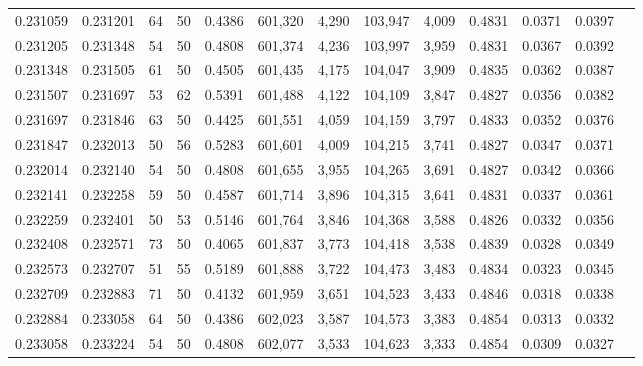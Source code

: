\begin{tabular}{rrrrrrrrrrrrr}
0.231059 & 0.231201 &    64 &  50 &                                     0.4386 & 601,320 &   4,290 & 103,947 &   4,009 & 0.4831 & 0.0371 & 0.0397 \\
0.231205 & 0.231348 &    54 &  50 &                                     0.4808 & 601,374 &   4,236 & 103,997 &   3,959 & 0.4831 & 0.0367 & 0.0392 \\
0.231348 & 0.231505 &    61 &  50 &                                     0.4505 & 601,435 &   4,175 & 104,047 &   3,909 & 0.4835 & 0.0362 & 0.0387 \\
0.231507 & 0.231697 &    53 &  62 &                                     0.5391 & 601,488 &   4,122 & 104,109 &   3,847 & 0.4827 & 0.0356 & 0.0382 \\
0.231697 & 0.231846 &    63 &  50 &                                     0.4425 & 601,551 &   4,059 & 104,159 &   3,797 & 0.4833 & 0.0352 & 0.0376 \\
0.231847 & 0.232013 &    50 &  56 &                                     0.5283 & 601,601 &   4,009 & 104,215 &   3,741 & 0.4827 & 0.0347 & 0.0371 \\
0.232014 & 0.232140 &    54 &  50 &                                     0.4808 & 601,655 &   3,955 & 104,265 &   3,691 & 0.4827 & 0.0342 & 0.0366 \\
0.232141 & 0.232258 &    59 &  50 &                                     0.4587 & 601,714 &   3,896 & 104,315 &   3,641 & 0.4831 & 0.0337 & 0.0361 \\
0.232259 & 0.232401 &    50 &  53 &                                     0.5146 & 601,764 &   3,846 & 104,368 &   3,588 & 0.4826 & 0.0332 & 0.0356 \\
0.232408 & 0.232571 &    73 &  50 &                                     0.4065 & 601,837 &   3,773 & 104,418 &   3,538 & 0.4839 & 0.0328 & 0.0349 \\
0.232573 & 0.232707 &    51 &  55 &                                     0.5189 & 601,888 &   3,722 & 104,473 &   3,483 & 0.4834 & 0.0323 & 0.0345 \\
0.232709 & 0.232883 &    71 &  50 &                                     0.4132 & 601,959 &   3,651 & 104,523 &   3,433 & 0.4846 & 0.0318 & 0.0338 \\
0.232884 & 0.233058 &    64 &  50 &                                     0.4386 & 602,023 &   3,587 & 104,573 &   3,383 & 0.4854 & 0.0313 & 0.0332 \\
0.233058 & 0.233224 &    54 &  50 &                                     0.4808 & 602,077 &   3,533 & 104,623 &   3,333 & 0.4854 & 0.0309 & 0.0327 \\

\end{tabular}
